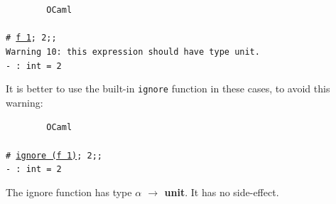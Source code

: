 \documentclass[]{book}
\newcommand{\smspace}{\vspace{4mm}}
\begin{document}
\smspace
\noindent\verb!        OCaml!\\
\noindent\\
\texttt{\# }\underline{\verb!f 1!}\texttt{; 2;;}\\                         
\texttt{Warning 10:\ this expression should have type unit.}\\
\texttt{- :\ int = 2}
\smspace

\noindent It is better to use the built-in \texttt{ignore} function in these cases, to avoid this warning:

\smspace
\noindent\verb!        OCaml!\\
\noindent\\
\texttt{\# }\underline{\verb!ignore (f 1)!}\texttt{; 2;;}\\                         
\texttt{- :\ int = 2}
\smspace

\noindent The ignore function has type \textsf{\textbf{$\alpha$ $\rightarrow$ unit}}. It has no side-effect.
\end{document}
